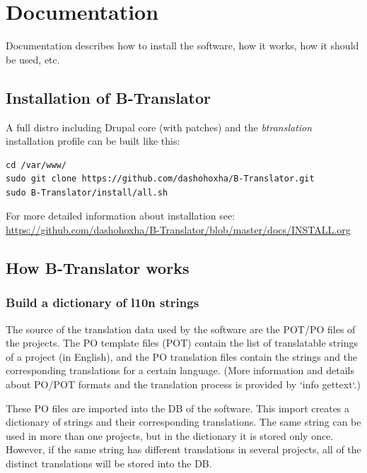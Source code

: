 \documentclass[11pt]{article}
\begin{document}
\section{Documentation}
\label{sec-8}


  Documentation describes how to install the software, how it works,
  how it should be used, etc.

\subsection{Installation of B-Translator}
\label{sec-8.1}


   A full distro including Drupal core (with patches) and the
   \emph{btranslation} installation profile can be built like this:

\begin{verbatim}
cd /var/www/
sudo git clone https://github.com/dashohoxha/B-Translator.git
sudo B-Translator/install/all.sh
\end{verbatim}



   For more detailed information about installation see:
   \href{https://github.com/dashohoxha/B-Translator/blob/master/docs/INSTALL.org}{https://github.com/dashohoxha/B-Translator/blob/master/docs/INSTALL.org}

\subsection{How B-Translator works}
\label{sec-8.2}


\subsubsection{Build a dictionary of l10n strings}
\label{sec-8.2.1}


    The source of the translation data used by the software are the
    POT/PO files of the projects.  The PO template files (POT) contain
    the list of translatable strings of a project (in English), and the
    PO translation files contain the strings and the corresponding
    translations for a certain language.  (More information and details
    about PO/POT formats and the translation process is provided by
    `info gettext`.)

    These PO files are imported into the DB of the software. This
    import creates a dictionary of strings and their corresponding
    translations. The same string can be used in more than one
    projects, but in the dictionary it is stored only once. However, if
    the same string has different translations in several projects, all
    of the distinct translations will be stored into the DB.
\end{document}
